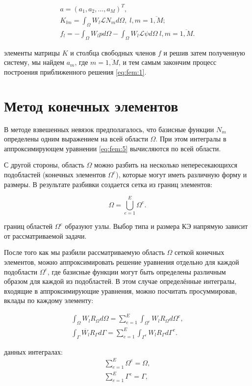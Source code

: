 \documentclass[14pt]{extreport}
\begin{document}

\begin{gather}
a = (a_1,a_2,\dots, a_M)^T, \\
K_{lm}=\int_\Omega W_l \mathcal L N_m  d\Omega, \; l,m=\overline{1,M}; \\
f_l=-\int_\Omega W_l p d \Omega-\int_\Omega W_l \mathcal L \psi d \Omega \; l,m=\overline{1,M}.
\end{gather}

 элементы матрицы $K$ и столбца свободных членов $f$ и решив затем полученную систему, мы найдем $a_m$, где $m=\overline{1,M}$, и тем самым закончим процесс построения приближенного решения \eqref{eq:fem:1}.

\section{Метод конечных элементов}
В методе взвешенных невязок предполагалось, что базисные функции $N_m$ определены одним выражением на всей области $\Omega$. При этом интегралы в аппроксимирующем уравнении \eqref{eq:fem:5} вычисляются по всей области.

С другой стороны, область $\Omega$ можно разбить на несколько непересекающихся подобластей (конечных элементов $\Omega^e$), которые могут иметь различную форму и размеры. В результате разбивки создается сетка из границ элементов:

$$\Omega=\bigcup\limits_{e=1}^E\Omega^{e}.$$


 границ областей $\Omega^{e}$ образуют узлы. Выбор типа и размера КЭ напрямую зависит от рассматриваемой задачи.

После того как мы разбили рассматриваемую область $\Omega$ сеткой конечных элементов, можно аппроксимировать решение уравнения отдельно для каждой подобласти $\Omega^{e}$, где базисные функции могут быть определены различным образом для каждой из подобластей. В этом случае определённые интегралы, входящие в аппроксимирующие уравнения, можно посчитать просуммировав, вклады по каждому элементу:

\begin{gather}
\int_\Omega W_l R_\Omega d\Omega = \sum\limits_{e=1}^E\int_{\Omega^{e}} W_l R_\Omega d\Omega^e, \nonumber\\
\int_\Gamma \overline{W_l} R_\Gamma d\Gamma = \sum\limits_{e=1}^E\int_{\Gamma^{e}} W_l R_\Gamma d\Gamma^e.
\end{gather}

 данных интегралах:
\begin{gather}
\sum\limits_{e=1}^E\Omega^e=\Omega, \\
\sum\limits_{e=1}^E\Gamma^e=\Gamma,
\end{gather}
\end{document}

